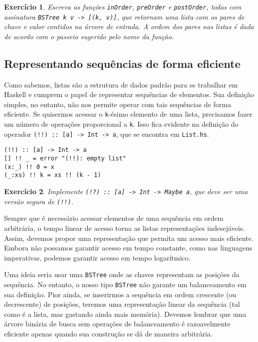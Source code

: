\documentclass[a4paper]{article}
\newtheorem{exercicio}{Exercício}
\begin{document}
\begin{exercicio}
	Escreva as funções \emph{\texttt{inOrder}}, \emph{\texttt{preOrder}} e \emph{\texttt{postOrder}}, todas com assinatura \emph{\texttt{BSTree k v -> [(k, v)]}}, que retornam uma lista com os pares de chave e valor contidos na árvore de entrada.
	A ordem dos pares nas listas é dada de acordo com o passeio sugerido pelo nome da função.
\end{exercicio}

\subsection{Representando sequências de forma eficiente}

Como sabemos, listas são a estrutura de dados padrão para se trabalhar em Haskell e cumprem o papel de representar sequências de elementos.
Sua definição simples, no entanto, não nos permite operar com tais sequências de forma eficiente.
Se quisermos acessar o \texttt{k}-ésimo elemento de uma lista, precisamos fazer um número de operações proporcional a \texttt{k}.
Isso fica evidente na definição do operador \texttt{(!!) :: [a] -> Int -> a}, que se encontra em \texttt{List.hs}.

\begin{verbatim}
(!!) :: [a] -> Int -> a
[] !! _ = error "(!!): empty list"
(x:_) !! 0 = x
(_:xs) !! k = xs !! (k - 1)
\end{verbatim}

\begin{exercicio}
	Implemente \emph{\texttt{(!?) :: [a] -> Int -> Maybe a}}, que deve ser uma versão segura de \emph{\texttt{(!!)}}.
\end{exercicio}

Sempre que é necessário acessar elementos de uma sequência em ordem arbitrária, o tempo linear de acesso torna as listas representações indesejáveis.
Assim, devemos propor uma representação que permita um acesso mais eficiente.
Embora não possamos garantir acesso em tempo constante, como nas linguagens imperativas, podemos garantir acesso em tempo logarítmico.

Uma ideia seria usar uma \texttt{BSTree} onde as chaves representam as posições da sequência.
No entanto, o nosso tipo \texttt{BSTree} não garante um balanceamento em sua definição.
Pior ainda, se inserirmos a sequência em ordem crescente (ou decrescente) de posições, teremos uma representação linear da sequência (tal como é a lista, mas gastando ainda mais memória).
Devemos lembrar que uma árvore binária de busca sem operações de balanceamento é razoavelmente eficiente apenas quando sua construção se dá de maneira arbitrária.
\end{document}
